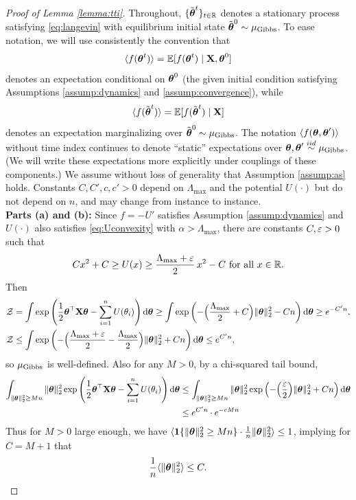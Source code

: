 \begin{proof}[Proof of Lemma \ref{lemma:tti}]
Throughout, $\{\tilde{\boldsymbol{\theta}}^t\}_{t \in \mathbb{R}}$ denotes a stationary
process satisfying \eqref{eq:langevin} with equilibrium initial state
$\tilde{\boldsymbol{\theta}}^0 \sim \mu_{\mathrm{Gibbs}}$.
To ease notation, we will use consistently the convention that
\[\langle f(\boldsymbol{\theta}^t) \rangle=\mathbb{E}[f(\boldsymbol{\theta}^t) \mid \mathbf{X},\boldsymbol{\theta}^0]\]
denotes an expectation conditional on $\boldsymbol{\theta}^0$
(the given initial condition satisfying Assumptions \ref{assump:dynamics} and
\ref{assump:convergence}), while
\[\langle f(\tilde {\boldsymbol{\theta}}^t) \rangle=\mathbb{E}[f(\tilde {\boldsymbol{\theta}}^t) \mid \mathbf{X}]\]
denotes an expectation marginalizing over $\tilde{\boldsymbol{\theta}}^0 \sim \mu_{\mathrm{Gibbs}}$.
The notation
$\langle f(\boldsymbol{\theta},\boldsymbol{\theta}') \rangle$ without time index continues to denote
``static'' expectations over $\boldsymbol{\theta},\boldsymbol{\theta}' \overset{iid}{\sim} \mu_{\mathrm{Gibbs}}$.
(We will write these expectations more explicitly under couplings of these
components.) We assume without loss of generality that Assumption
\ref{assump:as} holds.
Constants $C,C',c,c'>0$ depend on $\Lambda_{\max}$ and the potential $U(\cdot)$
but do not depend on $n$, and may change from instance to instance.\\

{\bf Parts (a) and (b):} Since $f=-U'$ satisfies Assumption
\ref{assump:dynamics} and $U(\cdot)$ also satisfies \eqref{eq:Uconvexity} with
$\alpha>\Lambda_{\max}$, there are constants $C,\varepsilon>0$ such that
\[Cx^2+C \geq U(x) \geq \frac{\Lambda_{\max}+\varepsilon}{2}\,x^2-C \text{ for all } x \in \mathbb{R}.\]
Then
\begin{align*}
\mathcal{Z}&=\int \exp\left(\frac{1}{2}\boldsymbol{\theta}^\top \mathbf{X}\boldsymbol{\theta}-\sum_{i=1}^n
U(\theta_i)\right)\mathrm{d} \boldsymbol{\theta}
\geq \int \exp\left({-}\Big(\frac{\Lambda_{\max}}{2}+C\Big)\|\boldsymbol{\theta}\|_2^2
-Cn\right)\mathrm{d}\boldsymbol{\theta} \geq e^{-C'n},\\
\mathcal{Z}&\leq \int\exp\left({-}\Big(\frac{\Lambda_{\max}+\varepsilon}{2}-\frac{\Lambda_{\max}}{2}\Big)\|\boldsymbol{\theta}\|_2^2
+Cn\right)\mathrm{d}\boldsymbol{\theta} \leq e^{C'n},
\end{align*}
so $\mu_{\mathrm{Gibbs}}$ is well-defined.
Also for any $M>0$, by a chi-squared tail bound,
\begin{align*}
\int_{\|\boldsymbol{\theta}\|_2^2 \geq Mn}
\|\boldsymbol{\theta}\|_2^2 \exp\left(\frac{1}{2}\boldsymbol{\theta}^\top \mathbf{X}\boldsymbol{\theta}-\sum_{i=1}^n
U(\theta_i)\right)\mathrm{d} \boldsymbol{\theta}
&\leq \int_{\|\boldsymbol{\theta}\|_2^2 \geq Mn}
\|\boldsymbol{\theta}\|_2^2
\exp\left({-}\Big(\frac{\varepsilon}{2}\Big)\|\boldsymbol{\theta}\|_2^2
+Cn\right)\mathrm{d}\boldsymbol{\theta}\\
&\leq e^{C'n} \cdot e^{-cMn}
\end{align*}
Thus for $M>0$ large enough, we have
$\langle \mathbf{1}\{\|\boldsymbol{\theta}\|_2^2 \geq Mn\} \cdot \frac{1}{n}\|\boldsymbol{\theta}\|_2^2 \rangle
\leq 1$, implying for $C=M+1$ that
\begin{equation}\label{eq:thetanormbound}
\frac{1}{n}\langle \|\boldsymbol{\theta}\|_2^2 \rangle \leq C.
\end{equation}


\end{proof}
